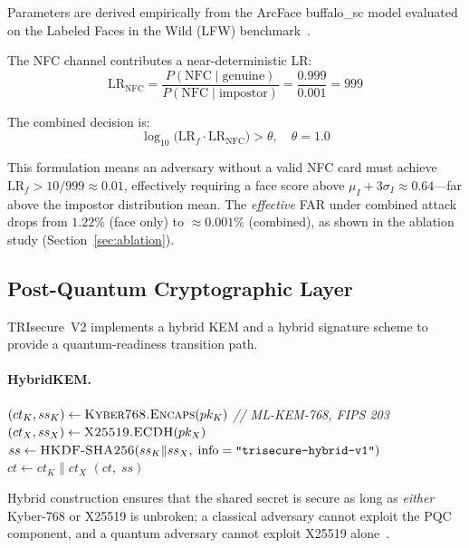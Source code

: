 \documentclass[pdflatex,sn-mathphys-num]{sn-jnl}%
\theoremstyle{thmstyleone}%
\theoremstyle{thmstyletwo}%
\theoremstyle{thmstylethree}%
\begin{document}
Parameters are derived empirically from the ArcFace buffalo\_sc model evaluated
on the Labeled Faces in the Wild (LFW) benchmark~\cite{deng2019arcface}.

The NFC channel contributes a near-deterministic LR:
\begin{equation}
  \mathrm{LR}_{\mathrm{NFC}} = \frac{P(\mathrm{NFC}\mid\text{genuine})}{P(\mathrm{NFC}\mid\text{impostor})} = \frac{0.999}{0.001} = 999
\end{equation}

The combined decision is:
\begin{equation}
  \log_{10}\!\bigl(\mathrm{LR}_f \cdot \mathrm{LR}_{\mathrm{NFC}}\bigr) > \theta, \quad \theta = 1.0
\end{equation}

This formulation means an adversary without a valid NFC card must achieve
$\mathrm{LR}_f > 10 / 999 \approx 0.01$, effectively requiring a face score
above $\mu_I + 3\sigma_I \approx 0.64$—far above the impostor distribution
mean. The \emph{effective} FAR under combined attack drops from $1.22\%$ (face
only) to $\approx 0.001\%$ (combined), as shown in the ablation study
(Section~\ref{sec:ablation}).

\subsection{Post-Quantum Cryptographic Layer}\label{sec:pqc}

TRIsecure~V2 implements a hybrid KEM and a hybrid signature scheme to provide a
quantum-readiness transition path.

\paragraph{HybridKEM.}

\begin{algorithm}[H]
\caption{TRIsecure HybridKEM.Encapsulate($pk$)}
\begin{algorithmic}[1]
  \State $(ct_K, ss_K) \gets \textsc{Kyber768.Encaps}(pk_K)$ \quad \textit{// ML-KEM-768, FIPS 203}
  \State $(ct_X, ss_X) \gets \textsc{X25519.ECDH}(pk_X)$
  \State $ss \gets \textsc{HKDF-SHA256}(ss_K \| ss_X,\; \text{info}=\texttt{"trisecure-hybrid-v1"})$
  \State $ct \gets ct_K \| ct_X$
  \State \Return $(ct,\; ss)$
\end{algorithmic}
\end{algorithm}

Hybrid construction ensures that the shared secret is secure as long as
\emph{either} Kyber-768 or X25519 is unbroken; a classical adversary cannot
exploit the PQC component, and a quantum adversary cannot exploit X25519
alone~\cite{bernstein2017post}.
\end{document}
